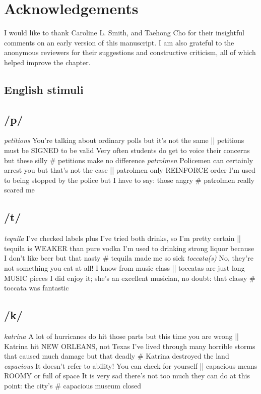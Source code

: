 \documentclass[output=paper]{langscibook}
\begin{document}
\section*{Acknowledgements}
I would like to thank Caroline L. Smith, and Taehong Cho for their insightful comments on an early version of this manuscript. I am also grateful to the anonymous reviewers for their suggestions and constructive criticism, all of which helped improve the chapter.

\begin{paperappendix}
\section{English stimuli}\label{A}\label{appendix:napo:a}

\subsection{/p/}
\ea \textit{petitions}
\ea You're talking about ordinary polls but it's not the same || petitions must be SIGNED to be valid
\ex Very often students do get to voice their concerns but these silly \# petitions make no difference
\z
\ex \textit{patrolmen}
\ea Policemen can certainly arrest you but that's not the case || patrolmen only REINFORCE order
\ex I'm used to being stopped by the police but I have to say: those angry \# patrolmen really scared me
\z\z

\subsection{/t/}\largerpage
\ea \textit{tequila}
\ea I’ve checked labels plus I’ve tried both drinks, so I’m pretty certain || tequila is WEAKER than pure vodka
\ex I’m used to drinking strong liquor because I don’t like beer but that nasty \# tequila made me so sick
\z
\ex \textit{toccata(s)}
\ea No, they’re not something you eat at all! I know from music class || toccatas are just long MUSIC pieces
\ex I did enjoy it; she's an excellent musician, no doubt: that classy \# toccata was fantastic
\z\z

\subsection{/k/}
\ea \textit{katrina}
\ea A lot of hurricanes do hit those parts but this time you are wrong || Katrina hit NEW ORLEANS, not Texas
\ex I’ve lived through many horrible storms that caused much damage but that deadly \# Katrina destroyed the land
\z
\ex \textit{capacious}
\ea It doesn’t refer to ability! You can check for yourself || capacious means ROOMY or full of space
\ex It is very sad there’s not too much they can do at this point: the city’s \# capacious museum closed
\z\z


\end{paperappendix}
\end{document}
